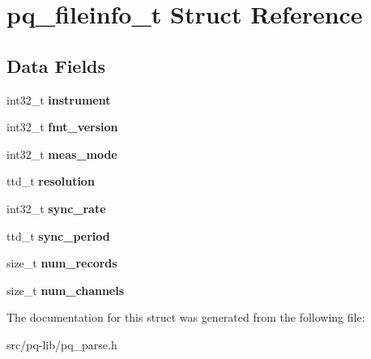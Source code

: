 \hypertarget{structpq__fileinfo__t}{}\section{pq\+\_\+fileinfo\+\_\+t Struct Reference}
\label{structpq__fileinfo__t}
\subsection*{Data Fields}
\begin{DoxyCompactItemize}
\item 
\hypertarget{structpq__fileinfo__t_afc44a1b484a6770184c14edc68cb6182}{}int32\+\_\+t {\bfseries instrument}\label{structpq__fileinfo__t_afc44a1b484a6770184c14edc68cb6182}

\item 
\hypertarget{structpq__fileinfo__t_af81c72cd3979b12b14058f9bad760099}{}int32\+\_\+t {\bfseries fmt\+\_\+version}\label{structpq__fileinfo__t_af81c72cd3979b12b14058f9bad760099}

\item 
\hypertarget{structpq__fileinfo__t_a737273bed6926c8382c032ed8f7806f3}{}int32\+\_\+t {\bfseries meas\+\_\+mode}\label{structpq__fileinfo__t_a737273bed6926c8382c032ed8f7806f3}

\item 
\hypertarget{structpq__fileinfo__t_ad3592984525c816b7c74fc401fc2d8a4}{}ttd\+\_\+t {\bfseries resolution}\label{structpq__fileinfo__t_ad3592984525c816b7c74fc401fc2d8a4}

\item 
\hypertarget{structpq__fileinfo__t_ac6b29510485dfd9356624c5cd010f9e1}{}int32\+\_\+t {\bfseries sync\+\_\+rate}\label{structpq__fileinfo__t_ac6b29510485dfd9356624c5cd010f9e1}

\item 
\hypertarget{structpq__fileinfo__t_a86db5cb5b2ac4c11349c1a89c17d2097}{}ttd\+\_\+t {\bfseries sync\+\_\+period}\label{structpq__fileinfo__t_a86db5cb5b2ac4c11349c1a89c17d2097}

\item 
\hypertarget{structpq__fileinfo__t_a17532831ec7773d20a0800faa4c2563e}{}size\+\_\+t {\bfseries num\+\_\+records}\label{structpq__fileinfo__t_a17532831ec7773d20a0800faa4c2563e}

\item 
\hypertarget{structpq__fileinfo__t_ac29c4bccc79a203250e47275064c0159}{}size\+\_\+t {\bfseries num\+\_\+channels}\label{structpq__fileinfo__t_ac29c4bccc79a203250e47275064c0159}

\end{DoxyCompactItemize}


The documentation for this struct was generated from the following file\+:\begin{DoxyCompactItemize}
\item 
src/pq-\/lib/pq\+\_\+parse.\+h\end{DoxyCompactItemize}

